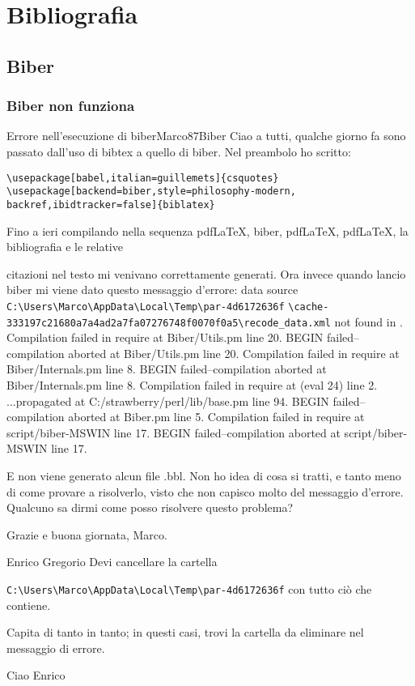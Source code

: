 \chapter{Bibliografia}
\label{chap:Bibliografia}
\section{Biber}
\label{sec:biber}
\subsection{Biber non funziona}
\begin{domanda}{Errore nell'esecuzione di biber}{Marco87}{Biber}
Ciao a tutti,
qualche giorno fa sono passato dall'uso di bibtex a quello di biber. Nel preambolo ho scritto:

\begin{lstlisting}
\usepackage[babel,italian=guillemets]{csquotes}
\usepackage[backend=biber,style=philosophy-modern,
backref,ibidtracker=false]{biblatex}

\end{lstlisting}

Fino a ieri compilando nella sequenza pdfLaTeX, biber, pdfLaTeX, pdfLaTeX, la bibliografia e le relative 

citazioni nel testo mi venivano correttamente generati. Ora invece quando lancio biber mi viene dato questo messaggio d'errore:
data source \verb!C:\Users\Marco\AppData\Local\Temp\par-4d6172636f!
\verb!\cache-333197c21680a7a4ad2a7fa07276748f0070f0a5\recode_data.xml! not found in . Compilation failed in require at Biber/Utils.pm line 20. BEGIN failed--compilation aborted at Biber/Utils.pm line 20. Compilation failed in require at Biber/Internals.pm line 8. BEGIN failed--compilation aborted at Biber/Internals.pm line 8. Compilation failed in require at (eval 24) line 2. ...propagated at C:/strawberry/perl/lib/base.pm line 94. BEGIN failed--compilation aborted at Biber.pm line 5. Compilation failed in require at script/biber-MSWIN line 17. BEGIN failed--compilation aborted at script/biber-MSWIN line 17.

E non viene generato alcun file .bbl. Non ho idea di cosa si tratti, e tanto meno di come provare a risolverlo, visto che non capisco molto del messaggio d'errore. Qualcuno sa dirmi come posso risolvere questo problema?

Grazie e buona giornata,
Marco. 
\end{domanda}
\begin{risposta}{Enrico Gregorio}
Devi cancellare la cartella 

\verb!C:\Users\Marco\AppData\Local\Temp\par-4d6172636f! con tutto ciò che contiene.

Capita di tanto in tanto; in questi casi, trovi la cartella da eliminare nel messaggio di errore.

Ciao
Enrico 

\end{risposta}

